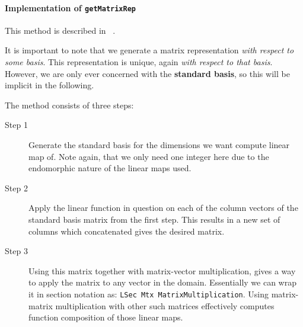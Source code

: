 \paragraph{Implementation of \texttt{getMatrixRep}}
This method is described in
~\cite[Representing a Linear Map by a Matrix, ch. 3, p. 70]{ladr}.


It is important to note that we generate a matrix representation \textit{with
respect to some basis}.  This representation is unique, again
\textit{with respect to that basis}. However, we are only ever concerned with
the \textbf{standard basis}, so this will be implicit in the following.

The method consists of three steps:
\begin{description}
\item [Step 1] Generate the standard basis for the dimensions we want compute
linear map of.  Note again, that we only need one integer here due to the
endomorphic nature of the linear maps used.
\item [Step 2] Apply the linear function in question on each of
the column vectors of the standard basis matrix from the first step.  This
results in a
new set of columns which concatenated gives the desired matrix.
\item [Step 3] Using this matrix together with matrix-vector multiplication,
gives a way to apply the matrix to any vector in the domain.  Essentially
we can wrap it in section notation as: \texttt{LSec Mtx MatrixMultiplication}.
Using matrix-matrix multiplication with other such matrices effectively computes
function composition of those linear maps.
\end{description}
